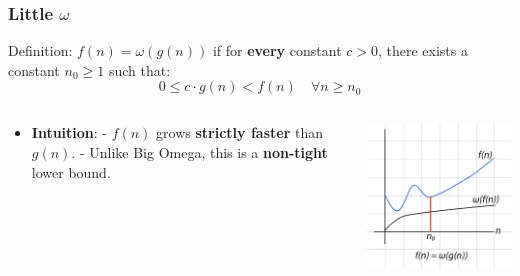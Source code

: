 \documentclass[10pt,aspectratio=43]{beamer}
\begin{document}
\begin{frame}
  \frametitle{Little $\omega$}

  \begin{block}{Definition:}
        $f(n) = \omega(g(n))$ if for \textbf{every} constant $c > 0$, there exists a constant $n_0 \geq 1$ such that:
        \[
          0 \leq c \cdot g(n) < f(n) \quad \forall n \geq n_0
        \]
\end{block}
        
  \begin{columns}

    \begin{column}{0.7\textwidth} 
      \begin{itemize}
        \item \textbf{Intuition}:  
        - $f(n)$ grows \textbf{strictly faster} than $g(n)$.  
        - Unlike Big Omega, this is a \textbf{non-tight} lower bound.  
        \vspace{3pt}
      \end{itemize}
    \end{column}

    \begin{column}{0.3\textwidth} 
      \includegraphics[width=\textwidth]{figures/MasterTheorem/little_omega.jpg}
    \end{column}
  \end{columns}
\end{frame}
\end{document}
